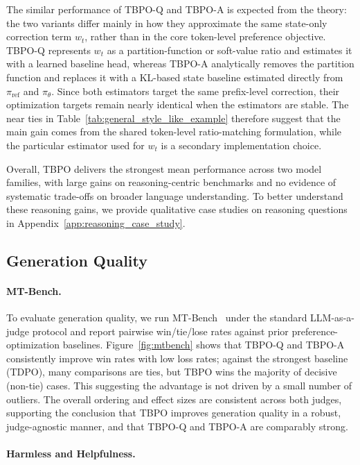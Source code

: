 \documentclass{article}
\theoremstyle{plain}
\theoremstyle{definition}
\theoremstyle{remark}
\begin{document}
The similar performance of TBPO-Q and TBPO-A is expected from the theory: the two variants differ mainly in how they approximate the same state-only correction term $w_t$, rather than in the core token-level preference objective. TBPO-Q represents $w_t$ as a partition-function or soft-value ratio and estimates it with a learned baseline head, whereas TBPO-A analytically removes the partition function and replaces it with a KL-based state baseline estimated directly from $\pi_{\mathrm{ref}}$ and $\pi_\theta$. Since both estimators target the same prefix-level correction, their optimization targets remain nearly identical when the estimators are stable. The near ties in Table~\ref{tab:general_style_like_example} therefore suggest that the main gain comes from the shared token-level ratio-matching formulation, while the particular estimator used for $w_t$ is a secondary implementation choice.

Overall, TBPO delivers the strongest mean performance across two model families, with large gains on reasoning-centric benchmarks and no evidence of systematic trade-offs on broader language understanding. To better understand these reasoning gains, we provide qualitative case studies on reasoning questions in Appendix~\ref{app:reasoning_case_study}.

\subsection{Generation Quality}

\paragraph{MT-Bench.} To evaluate generation quality, we run MT-Bench~\cite{zheng2023judging} under the standard LLM-as-a-judge protocol and report pairwise win/tie/lose rates against prior preference-optimization baselines. Figure~\ref{fig:mtbench} shows that TBPO-Q and TBPO-A consistently improve win rates with low loss rates; against the strongest baseline (TDPO), many comparisons are ties, but TBPO wins the majority of decisive (non-tie) cases. This suggesting the advantage is not driven by a small number of outliers. The overall ordering and effect sizes are consistent across both judges, supporting the conclusion that TBPO improves generation quality in a robust, judge-agnostic manner, and that TBPO-Q and TBPO-A are comparably strong.

\paragraph{Harmless and Helpfulness.}
\end{document}
